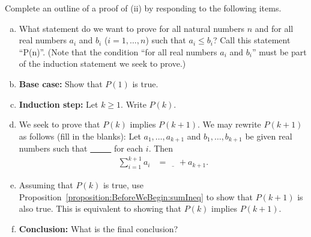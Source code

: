 \begin{exercise}
Complete an outline of a proof of (ii) by responding to the following items.
\begin{enumerate}[(a)]
\item
What statement do we want to prove  for all natural numbers $n$ and for all real numbers $a_i$ and $b_i$ ($i=1,\dots,n$)
such that $a_i\le b_i$? Call this statement ``P(n)''.
(Note that the condition ``for all real numbers $a_i$ and $b_i$''
must be part of the induction statement we seek to prove.)
\item
\textbf{Base case:} Show that $P(1)$ is true.
\item
\textbf{Induction step:}  Let $k\ge 1$. Write $P(k)$.
\item
We seek to prove that $P(k)$ implies $P(k+1)$.  We may rewrite $P(k+1)$ as follows (fill in the blanks):
Let $a_1,\dots,a_{k+1}$ and $b_1,\dots,b_{k+1}$ be given real numbers
such that \underline{~~~~~} for each $i$.
Then
\begin{align*}
\sum_{i=1}^{k+1}a_i
&=\underline{~~~~~} + a_{k+1}.
\end{align*}
\item
Assuming that $P(k)$ is true, use  Proposition~\ref{proposition:BeforeWeBegin:sumIneq} to show that $P(k+1)$ is also true.  This is equivalent to showing that $P(k)$ implies $P(k+1)$.
\item 
\textbf{Conclusion:} What is the final conclusion?
\end{enumerate}
\end{exercise}



